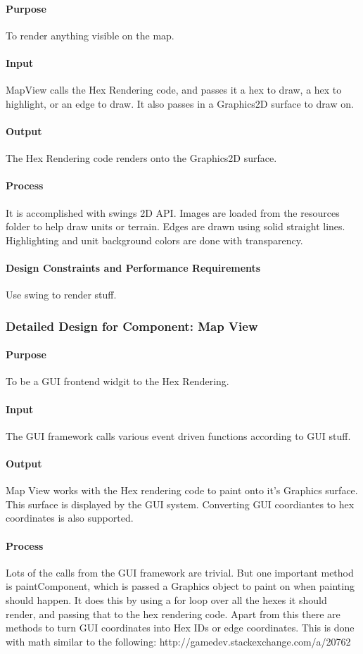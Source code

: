 \documentclass[12pt,a4paper,titlepage]{article}
\begin{document}
\paragraph{Purpose} To render anything visible on the map.
\paragraph{Input}
MapView calls the Hex Rendering code, and passes it a hex to draw, a hex to highlight,
or an edge to draw. It also passes in a Graphics2D surface to draw on.
\paragraph{Output}
The Hex Rendering code renders onto the Graphics2D surface.
\paragraph{Process}
It is accomplished with swings 2D API. Images are
loaded from the resources folder to help draw units or terrain. 
Edges are drawn using solid straight lines.
Highlighting and unit background colors are done with transparency.
\paragraph{Design Constraints and Performance Requirements}
Use swing to render stuff.

\subsubsection{Detailed Design for Component: Map View}
\paragraph{Purpose} To be a GUI frontend widgit to the Hex Rendering.
\paragraph{Input}
The GUI framework calls various event driven functions according to GUI stuff.
\paragraph{Output}
Map View works with the Hex rendering code to paint onto it's Graphics surface.
This surface is displayed by the GUI system.
Converting GUI coordiantes to hex coordinates is also supported.
\paragraph{Process}
Lots of the calls from the GUI framework are trivial. But one important 
method is paintComponent, which is passed a Graphics object to paint on when
painting should happen. It does this by using a for loop over all the hexes
it should render, and passing that to the hex rendering code.
Apart from this there are methods to turn GUI coordinates into Hex IDs or 
edge coordinates. This is done with math similar to the following:
http://gamedev.stackexchange.com/a/20762
\end{document}
